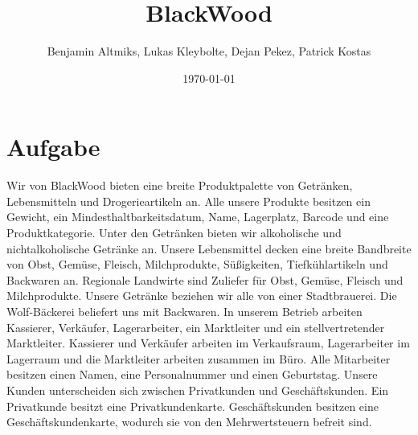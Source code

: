 \documentclass[a4paper,10pt]{scrartcl}
\title{BlackWood}
\author{Benjamin Altmiks, Lukas Kleybolte, Dejan Pekez, Patrick Kostas}
\date{\today}
\begin{document}
\maketitle
\section{Aufgabe}
Wir von BlackWood bieten eine breite Produktpalette von Getränken, Lebensmitteln und Drogerieartikeln an.\newline
Alle unsere Produkte besitzen ein Gewicht, ein Mindesthaltbarkeitsdatum, Name, Lagerplatz, Barcode und eine Produktkategorie.
Unter den Getränken bieten wir alkoholische und nichtalkoholische Getränke an.\newline
Unsere Lebensmittel decken eine breite Bandbreite von Obst, Gemüse, Fleisch, Milchprodukte, Süßigkeiten, Tiefkühlartikeln und Backwaren an.\newline
Regionale Landwirte sind Zuliefer für Obst, Gemüse, Fleisch und Milchprodukte.\newline
Unsere Getränke beziehen wir alle von einer Stadtbrauerei.\newline
Die Wolf-Bäckerei beliefert uns mit Backwaren.\newline
In unserem Betrieb arbeiten Kassierer, Verkäufer, Lagerarbeiter, ein Marktleiter und ein stellvertretender Marktleiter.\newline
Kassierer und Verkäufer arbeiten im Verkaufsraum, Lagerarbeiter im Lagerraum und die Marktleiter arbeiten zusammen im Büro.\newline
Alle Mitarbeiter besitzen einen Namen, eine Personalnummer und einen Geburtstag.\newline
Unsere Kunden unterscheiden sich zwischen Privatkunden und Geschäftskunden.\newline
Ein Privatkunde besitzt eine Privatkundenkarte. Geschäftskunden besitzen eine Geschäftskundenkarte, wodurch sie von den  Mehrwertsteuern befreit sind.\newline
\newpage
\end{document}
